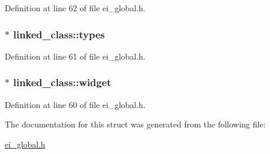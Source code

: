 Definition at line 62 of file ei\_\-global.h.\hypertarget{structlinked__class_a1626c90ecb1f9ff521052a39d8c8f9d8}{
\subsubsection[{types}]{$\ast$ {\bf linked\_\-class::types}}}
\label{structlinked__class_a1626c90ecb1f9ff521052a39d8c8f9d8}


Definition at line 61 of file ei\_\-global.h.\hypertarget{structlinked__class_a13744b44ac4379e0b9ed0e936c240e12}{
\subsubsection[{widget}]{$\ast$ {\bf linked\_\-class::widget}}}
\label{structlinked__class_a13744b44ac4379e0b9ed0e936c240e12}


Definition at line 60 of file ei\_\-global.h.

The documentation for this struct was generated from the following file:\begin{DoxyCompactItemize}
\item 
\hyperlink{ei__global_8h}{ei\_\-global.h}\end{DoxyCompactItemize}
